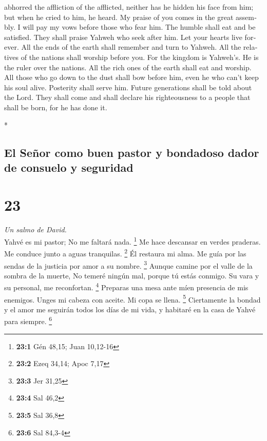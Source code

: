 \begin{paracol}{2}
\begin{otherlanguage}{english}
abhorred the affliction of the afflicted, neither has he hidden his face
from him; but when he cried to him, he heard.  My praise
of you comes in the great assembly. I will pay my vows before those who
fear him.  The humble shall eat and be satisfied. They
shall praise Yahweh who seek after him. Let your hearts live forever.
 All the ends of the earth shall remember and turn to
Yahweh. All the relatives of the nations shall worship before you.
 For the kingdom is Yahweh's. He is the ruler over the
nations.  All the rich ones of the earth shall eat and
worship. All those who go down to the dust shall bow before him, even he
who can't keep his soul alive.  Posterity shall serve
him. Future generations shall be told about the Lord. 
They shall come and shall declare his righteousness to a people that
shall be born, for he has done it.

\end{otherlanguage}

\switchcolumn[0]*

\hypertarget{el-seuxf1or-como-buen-pastor-y-bondadoso-dador-de-consuelo-y-seguridad}{%
\subsection{El Señor como buen pastor y bondadoso dador de consuelo y
seguridad}\label{el-seuxf1or-como-buen-pastor-y-bondadoso-dador-de-consuelo-y-seguridad}}

\hypertarget{section-44}{%
\section{23}\label{section-44}}

\emph{Un salmo de David.}\\
 Yahvé es mi pastor; No me faltará nada. \footnote{\textbf{23:1}
  Gén 48,15; Juan 10,12-16}  Me hace descansar en verdes
praderas. Me conduce junto a aguas tranquilas. \footnote{\textbf{23:2}
  Ezeq 34,14; Apoc 7,17}  Él restaura mi alma. Me guía por
las sendas de la justicia por amor a su nombre. \footnote{\textbf{23:3}
  Jer 31,25}  Aunque camine por el valle de la sombra de
la muerte, No temeré ningún mal, porque tú estás conmigo. Su vara y su
personal, me reconfortan. \footnote{\textbf{23:4} Sal 46,2}
 Preparas una mesa ante míen presencia de mis enemigos.
Unges mi cabeza con aceite. Mi copa se llena. \footnote{\textbf{23:5}
  Sal 36,8}  Ciertamente la bondad y el amor me seguirán
todos los días de mi vida, y habitaré en la casa de Yahvé para siempre.
\footnote{\textbf{23:6} Sal 84,3-4}


\end{paracol}
